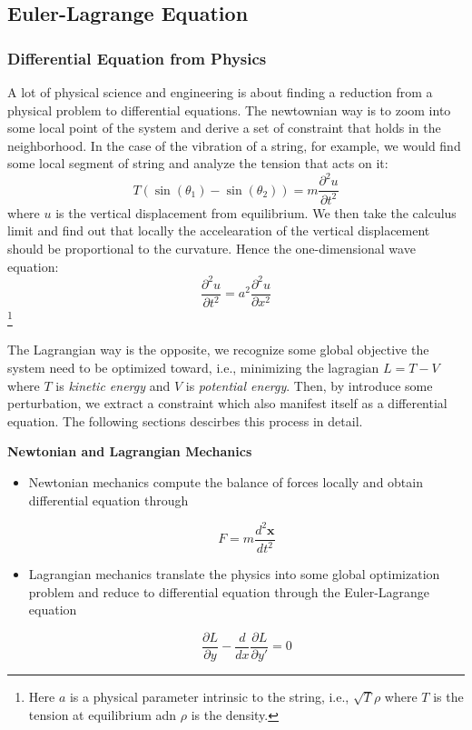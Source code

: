 \subsection{Euler-Lagrange Equation}

\subsubsection{Differential Equation from Physics}

A lot of physical science and engineering is about finding a reduction from a physical problem to differential equations. The newtownian way is to zoom into some local point of the system and derive a set of constraint that holds in the neighborhood. In the case of the vibration of a string, for example, we would find some local segment of string and analyze the tension that acts on it:
\begin{equation}
T(\sin(\theta_1)-\sin(\theta_2)) = m\frac{\partial^2 u}{\partial t^2}
\end{equation}
where $u$ is the vertical displacement from equilibrium. We then take the calculus limit and find out that locally the accelearation of the vertical displacement should be proportional to the curvature. Hence the one-dimensional wave equation:
\begin{equation}
\frac{\partial^2 u}{\partial t^2}=a^2 \frac{\partial^2 u}{\partial x^2}
\end{equation}
\footnote{Here $a$ is a physical parameter intrinsic to the string, i.e., $\sqrt{T}{\rho}$ where $T$ is the tension at equilibrium adn $\rho$ is the density.}

The Lagrangian way is the opposite, we recognize some global objective the system need to be optimized toward, i.e., minimizing the lagragian $L=T -V$ where $T$ is \textit{kinetic energy} and $V$ is \textit{potential energy}. Then, by introduce some perturbation, we extract a constraint which also manifest itself as a differential equation. The following sections descirbes this process in detail.

\begin{framed}
\textbf{Newtonian and Lagrangian Mechanics}\\
\begin{itemize}
\item Newtonian mechanics compute the balance of forces locally and obtain differential equation through

\begin{equation}
F=m\frac{d^2\mathbf{x}}{dt^2}
\end{equation}


\item Lagrangian mechanics translate the physics into some global optimization problem  and reduce to differential equation through the Euler-Lagrange equation

\begin{equation}
\frac{\partial L}{\partial y}- \frac{d}{dx}\frac{\partial L}{\partial y'}=0
\end{equation}
\end{itemize}
\end{framed}

